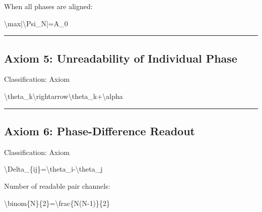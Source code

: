 \documentclass[
  a4paper,
]{article}
\newenvironment{Shaded}{}{}
\newcommand{\NormalTok}[1]{#1}
\begin{document}
When all phases are aligned:

\begin{Shaded}
\begin{Highlighting}[]
\NormalTok{\textbackslash{}max|\textbackslash{}Psi\_N|=A\_0}
\end{Highlighting}
\end{Shaded}

\begin{center}\rule{0.5\linewidth}{0.5pt}\end{center}

\subsection{Axiom 5: Unreadability of Individual
Phase}\label{axiom-5-unreadability-of-individual-phase}

Classification: Axiom

\begin{Shaded}
\begin{Highlighting}[]
\NormalTok{\textbackslash{}theta\_k\textbackslash{}rightarrow\textbackslash{}theta\_k+\textbackslash{}alpha}
\end{Highlighting}
\end{Shaded}

\begin{center}\rule{0.5\linewidth}{0.5pt}\end{center}

\subsection{Axiom 6: Phase-Difference
Readout}\label{axiom-6-phase-difference-readout}

Classification: Axiom

\begin{Shaded}
\begin{Highlighting}[]
\NormalTok{\textbackslash{}Delta\_\{ij\}=\textbackslash{}theta\_i{-}\textbackslash{}theta\_j}
\end{Highlighting}
\end{Shaded}

Number of readable pair channels:

\begin{Shaded}
\begin{Highlighting}[]
\NormalTok{\textbackslash{}binom\{N\}\{2\}=\textbackslash{}frac\{N(N{-}1)\}\{2\}}
\end{Highlighting}
\end{Shaded}
\end{document}
